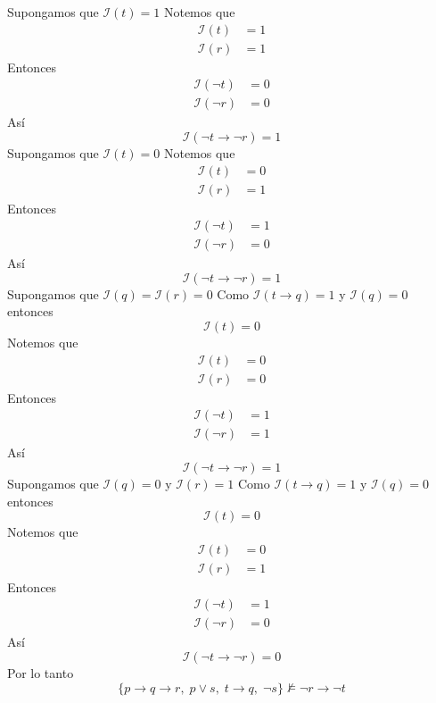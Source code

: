 \documentclass[a4paper]{article}
\begin{document}
Supongamos que \(\mathcal{I}\left(t\right) = 1\)
\newline
Notemos que
\begin{align*}
    \mathcal{I}\left(t\right) &= 1 \\
    \mathcal{I}\left(r\right) &= 1
\end{align*}
Entonces 
\begin{align*}
    \mathcal{I}\left(\neg t\right) &= 0 \\
    \mathcal{I}\left(\neg r\right) &= 0
\end{align*}
Así
\[
    \mathcal{I}\left(\neg t \to \neg r\right) = 1
\]
Supongamos que \(\mathcal{I}\left(t\right) = 0\)
\newline
Notemos que
\begin{align*}
    \mathcal{I}\left(t\right) &= 0 \\
    \mathcal{I}\left(r\right) &= 1
\end{align*}
Entonces 
\begin{align*}
    \mathcal{I}\left(\neg t\right) &= 1 \\
    \mathcal{I}\left(\neg r\right) &= 0
\end{align*}
Así
\[
    \mathcal{I}\left(\neg t \to \neg r\right) = 1
\]
Supongamos que \(\mathcal{I}\left(q\right) = \mathcal{I}\left(r\right) = 0\)
\newline 
Como \(\mathcal{I}\left(t \to q\right) = 1\) y \(\mathcal{I}\left(q\right) = 0\) entonces
\[
    \mathcal{I}\left(t\right) = 0
\]
Notemos que
\begin{align*}
    \mathcal{I}\left(t\right) &= 0 \\
    \mathcal{I}\left(r\right) &= 0
\end{align*}
Entonces 
\begin{align*}
    \mathcal{I}\left(\neg t\right) &= 1 \\
    \mathcal{I}\left(\neg r\right) &= 1
\end{align*}
Así
\[
    \mathcal{I}\left(\neg t \to \neg r\right) = 1
\]
Supongamos que \(\mathcal{I}\left(q\right) = 0\) y \(\mathcal{I}\left(r\right) = 1\)
\newline 
Como \(\mathcal{I}\left(t \to q\right) = 1\) y \(\mathcal{I}\left(q\right) = 0\) entonces
\[
    \mathcal{I}\left(t\right) = 0
\]
Notemos que
\begin{align*}
    \mathcal{I}\left(t\right) &= 0 \\
    \mathcal{I}\left(r\right) &= 1
\end{align*}
Entonces 
\begin{align*}
    \mathcal{I}\left(\neg t\right) &= 1 \\
    \mathcal{I}\left(\neg r\right) &= 0
\end{align*}
Así
\[
    \mathcal{I}\left(\neg t \to \neg r\right) = 0
\]
Por lo tanto
\[
    \{p \to q \to r,\; p\lor s,\; t \to q,\;\lnot s \} \not\models
    \lnot r  \to\lnot t
\]
\newpage
\end{document}
